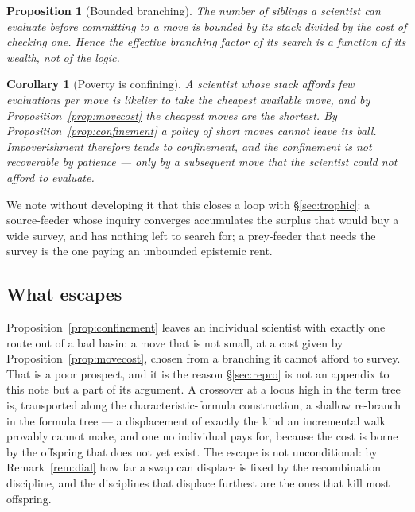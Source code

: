 \documentclass[11pt]{article}
\theoremstyle{plain}
\newtheorem{proposition}[theorem]{Proposition}
\newtheorem{corollary}[theorem]{Corollary}
\theoremstyle{definition}
\begin{document}
\begin{proposition}[Bounded branching]
\label{prop:branching}
The number of siblings a scientist can evaluate before committing to a move is bounded by its stack
divided by the cost of checking one. Hence the effective branching factor of its search is a function
of its wealth, not of the logic.
\end{proposition}

\begin{corollary}[Poverty is confining]
\label{cor:poverty}
A scientist whose stack affords few evaluations per move is likelier to take the cheapest available
move, and by Proposition~\ref{prop:movecost} the cheapest moves are the shortest. By
Proposition~\ref{prop:confinement} a policy of short moves cannot leave its ball. Impoverishment
therefore tends to confinement, and the confinement is not recoverable by patience --- only by a
subsequent move that the scientist could not afford to evaluate.
\end{corollary}

We note without developing it that this closes a loop with \S\ref{sec:trophic}: a source-feeder whose
inquiry converges accumulates the surplus that would buy a wide survey, and has nothing left to search
for; a prey-feeder that needs the survey is the one paying an unbounded epistemic rent.

\subsection{What escapes}
\label{sec:escape}

Proposition~\ref{prop:confinement} leaves an individual scientist with exactly one route out of a bad
basin: a move that is not small, at a cost given by Proposition~\ref{prop:movecost}, chosen from a
branching it cannot afford to survey. That is a poor prospect, and it is the reason
\S\ref{sec:repro} is not an appendix to this note but a part of its argument. A crossover at a locus
high in the term tree is, transported along the characteristic-formula construction, a shallow
re-branch in the formula tree --- a displacement of exactly the kind an incremental walk provably
cannot make, and one no individual pays for, because the cost is borne by the offspring that does not
yet exist. The escape is not unconditional: by Remark~\ref{rem:dial} how far a swap can displace is
fixed by the recombination discipline, and the disciplines that displace furthest are the ones that
kill most offspring.
\end{document}
